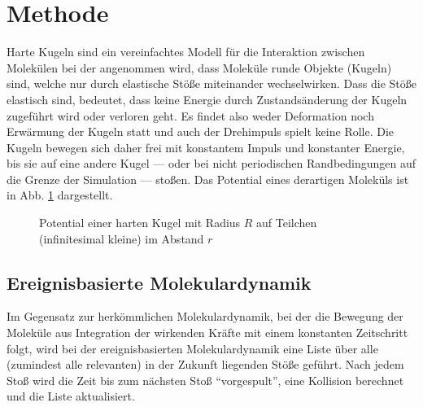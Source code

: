 \section{Methode }
Harte Kugeln sind ein vereinfachtes Modell für die Interaktion zwischen Molekülen bei der angenommen wird, dass Moleküle runde Objekte (Kugeln) sind, welche nur durch elastische Stöße miteinander wechselwirken.
Dass die Stöße elastisch sind, bedeutet, dass keine Energie durch Zustandsänderung der Kugeln zugeführt wird oder verloren geht. Es findet also weder Deformation noch Erwärmung der Kugeln statt und auch der Drehimpuls spielt keine Rolle. Die Kugeln bewegen sich daher frei mit konstantem Impuls und konstanter Energie, bis sie auf eine andere Kugel --- oder bei nicht periodischen Randbedingungen auf die Grenze der Simulation --- stoßen. Das Potential eines derartigen Moleküls ist in Abb. \ref{fig:hkpotential} dargestellt.
\begin{figure}[H] \centering
{}
\caption{Potential einer harten Kugel mit Radius $R$ auf Teilchen (infinitesimal kleine) im Abstand $r$}
 \label{fig:hkpotential}
\end{figure} 
\subsection{Ereignisbasierte Molekulardynamik}

Im Gegensatz zur herkömmlichen Molekulardynamik, bei der die Bewegung der Moleküle aus Integration der wirkenden Kräfte mit einem konstanten Zeitschritt folgt, wird bei der ereignisbasierten Molekulardynamik eine Liste über alle (zumindest alle relevanten) in der Zukunft liegenden Stöße geführt. Nach jedem Stoß wird die Zeit bis zum nächsten Stoß ``vorgespult'', eine Kollision berechnet und die Liste aktualisiert.


